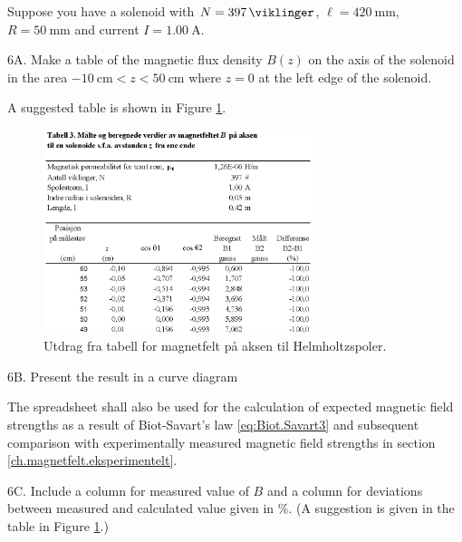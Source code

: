 \documentclass[../Elmag-labhefte-2020.tex]{subfiles}
\begin{document}
Suppose you have a solenoid with $N = \SI{397}{\viklinger}$, $\ell = \SI{420}{\mm}$, $R = \SI{50}{\mm}$ and current $I = \SI{1,00}{\ampere}$.

{\itsf 6A. Make a table of the magnetic flux density $B(z)$ on the axis of the solenoid in the area $\SI{-10}{\cm} < z < \SI{50}{\cm}$ where $z = 0$ at the left edge of the solenoid.} %


A suggested table is shown in Figure \ref{magnetfelt.tab3}.
%
\begin{figure}[ht]
    \begin{center}
    \includegraphics[width=0.7\textwidth]{fig/magnetfelt-tab3.eps}
    \end{center}
    \caption{%
        Utdrag fra tabell for magnetfelt på aksen til Helmholtzspoler.
    }
    \label{magnetfelt.tab3}
\end{figure}

{\itsf 6B. Present the result in a curve diagram}

The spreadsheet shall also be used for the calculation of expected magnetic field strengths as a result of Biot-Savart's law \eqref{eq:Biot.Savart3} and subsequent comparison with experimentally measured magnetic field strengths in section \ref{ch.magnetfelt.eksperimentelt}.

{\itsf 6C. Include a column for measured value of $B$ and a column for deviations between measured and calculated value given in \si{\percent}}. (A suggestion is given in the table in Figure \ref{magnetfelt.tab3}.)
\end{document}
